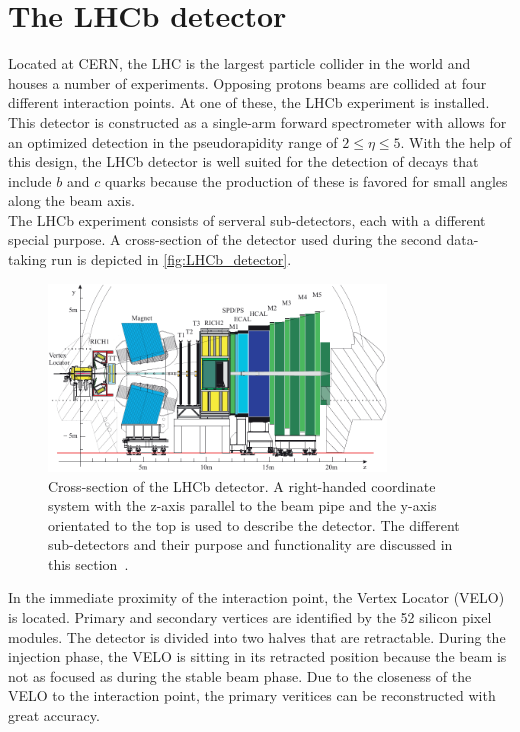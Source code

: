 \section{The LHCb detector}
\label{sec:Detector}
Located at CERN, the LHC is the largest particle collider in the world and houses a number of experiments. Opposing protons beams are collided at four different
interaction points. At one of these, the LHCb experiment is installed. This detector is constructed as a single-arm forward spectrometer with allows for an optimized detection in the pseudorapidity range
of $2≤\eta≤5$. With the help of this design, the LHCb detector is well suited for the detection of decays that include $b$ and $c$ quarks because the production of these is favored for small angles along the
beam axis. \\
The LHCb experiment consists of serveral sub-detectors, each with a different special purpose. A cross-section of the detector used during the second data-taking run is depicted in \autoref{fig:LHCb_detector}.
\begin{figure}
    \centering
    \includegraphics[width=0.8\textwidth]{content/pics/LHCb_detector.pdf}
    \caption{Cross-section of the LHCb detector. A right-handed coordinate system with the z-axis parallel to the beam pipe and the y-axis orientated to the top is used to describe the detector.%
    The different sub-detectors and their purpose and functionality are discussed in this section~\cite{LHCb_detector}.}
    \label{fig:LHCb_detector}
\end{figure}
In the immediate proximity of the interaction point, the Vertex Locator (VELO) is located. Primary and secondary vertices are identified by the 52 silicon pixel modules. The detector is divided into two
halves that are retractable. During the injection phase, the VELO is sitting in its retracted position because the beam is not as focused as during the stable beam phase. Due to the closeness of the VELO to the 
interaction point, the primary veritices can be reconstructed with great accuracy. \\

